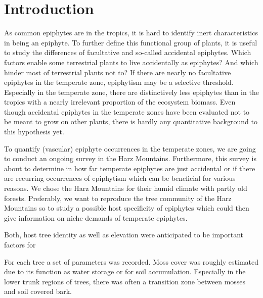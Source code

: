\documentclass[a4paper]{article}
\begin{document}
\section{Introduction}
As common epiphytes are in the tropics, it is hard to identify inert characteristics in being an epiphyte. To further define this functional group of plants, it is useful to study the differences of facultative and so-called accidental epiphytes. Which factors enable some terrestrial plants to live accidentally as epiphytes? And which hinder most of terrestrial plants not to? If there are nearly no facultative epiphytes in the temperate zone, epiphytism may be a selective threshold. Especially in the temperate zone, there are distinctively less epiphytes than in the tropics with a nearly irrelevant proportion of the ecosystem biomass. Even though accidental epiphytes in the temperate zones have been evaluated not to be meant to grow on other plants, there is hardly any quantitative background to this hypothesis yet.

To quantify (vascular) epiphyte occurrences in the temperate zones, we are going to conduct an ongoing survey in the Harz Mountains. Furthermore, this survey is about to determine in how far temperate epiphytes are just accidental or if there are recurring occurrences of epiphytism which can be beneficial for various reasons. We chose the Harz Mountains for their humid climate with partly old forests. Preferably, we want to reproduce the tree community of the Harz Mountains so to study a possible host specificity of epiphytes which could then give information on niche demands of temperate epiphytes.

Both, host tree identity as well as elevation were anticipated to be important factors for 

For each tree a set of parameters was recorded. Moss cover was roughly estimated due to its function as water storage or for soil accumulation. 
Especially in the lower trunk regions of trees, there was often a transition zone between mosses and soil covered bark. 
\end{document}
